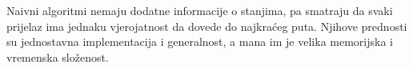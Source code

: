 Naivni algoritmi  nemaju dodatne informacije o stanjima, pa smatraju da svaki prijelaz ima jednaku vjerojatnost da dovede do najkraćeg puta. 
Njihove prednosti su jednostavna implementacija i generalnost, a mana im je velika memorijska i vremenska složenost. 
